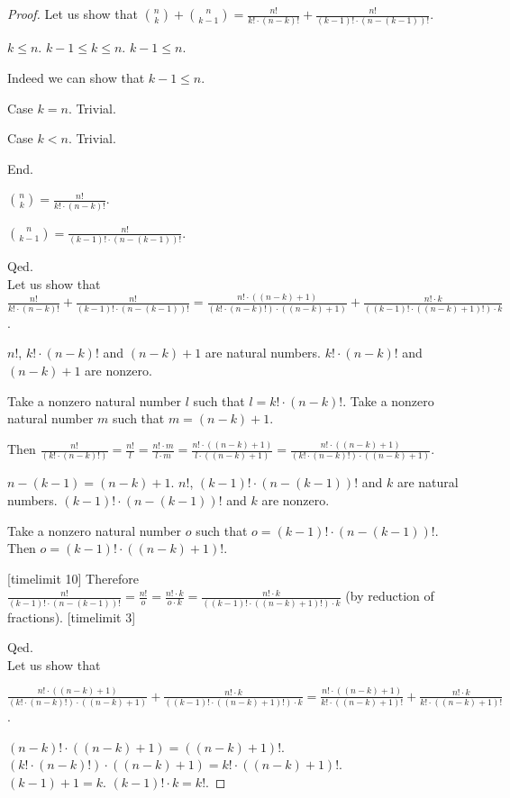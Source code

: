 \documentclass{article}
\begin{document}
\begin{forthel}
\begin{proof}
Let us show that
$\binom{n}{k} + \binom{n}{k-1} = \frac{n!}{k! \cdot (n-k)!} + \frac{n!}{(k-1)! \cdot (n-(k-1))!}$.

$k \leq n$.
$k-1 \leq k \leq n$.
$k-1 \leq n$.

Indeed we can show that $k-1 \leq n$.

Case $k = n$. Trivial.

Case $k < n$. Trivial.

End.

$\binom{n}{k} = \frac{n!}{k! \cdot (n-k)!}$.

$\binom{n}{k-1} = \frac{n!}{(k-1)! \cdot (n-(k-1))!}$.

Qed.
\\
 
Let us show that \\
$\frac{n!}{k! \cdot (n-k)!} + \frac{n!}{(k-1)! \cdot (n-(k-1))!} = 
\frac{n! \cdot ((n-k)+1)}{(k! \cdot (n-k)!) \cdot ((n-k)+1) } + 
\frac{n! \cdot k}{((k-1)! \cdot ((n-k)+1)!) \cdot k}$.

$n!$, $k! \cdot (n-k)!$ and $(n-k)+1$ are natural numbers.
$k! \cdot (n-k)!$ and $(n-k)+1$ are nonzero.

Take a nonzero natural number $l$ such that $l = k! \cdot (n-k)!$.
Take a nonzero natural number $m$ such that $m = (n-k)+1$.

Then $\frac{n!}{(k! \cdot (n-k)!)} = \frac{n!}{l} = \frac{n! \cdot m}{l \cdot m} = 
\frac{n! \cdot ((n-k)+1)}{l \cdot ((n-k)+1) } =  \frac{n! \cdot ((n-k)+1)}{(k! \cdot (n-k)!) \cdot ((n-k)+1) }$.

$n-(k-1) = (n-k) +1$.
$n!$, $(k-1)! \cdot (n-(k-1))!$ and $k$ are natural numbers.
$(k-1)! \cdot (n-(k-1))!$ and $k$ are nonzero.

Take a nonzero natural number $o$ such that $o = (k-1)! \cdot (n-(k-1))!$.
Then $o = (k-1)! \cdot ((n-k)+1)!$.

[timelimit 10]
Therefore $\frac{n!}{(k-1)! \cdot (n-(k-1))!} = \frac{n!}{o} = \frac{n! \cdot k}{o \cdot k}
= \frac{n! \cdot k}{((k-1)! \cdot ((n-k)+1)!) \cdot k}$ (by reduction of fractions).
[timelimit 3]

Qed.
\\
  
Let us show that 

$\frac{n! \cdot ((n-k)+1)}{(k! \cdot (n-k)!) \cdot ((n-k)+1) } + 
\frac{n! \cdot k}{((k-1)! \cdot ((n-k)+1)!) \cdot k} = 
\frac{n! \cdot ((n-k)+1)}{k! \cdot ((n-k)+1)! } + 
\frac{n! \cdot k}{k! \cdot ((n-k)+1)!}$.

$(n-k)! \cdot ((n-k)+1) = ((n-k)+1)!$. \\
$(k! \cdot (n-k)!) \cdot ((n-k)+1) = k! \cdot ((n-k)+1)!$. \\
$(k-1) + 1 = k$.
$(k-1)! \cdot k = k!$.


\end{proof}
\end{forthel}
\end{document}
